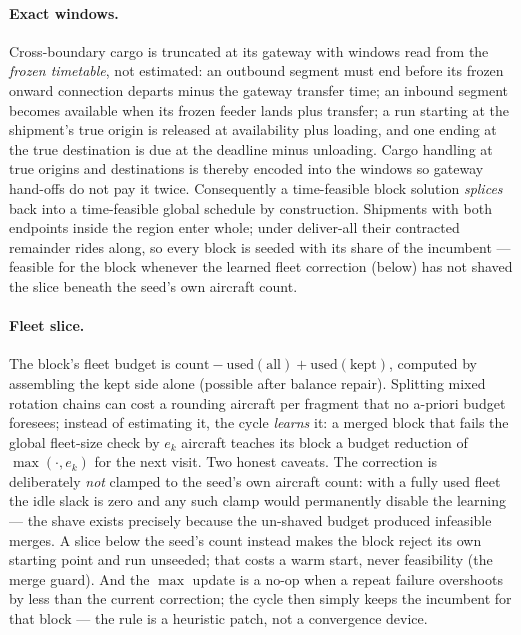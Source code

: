 \documentclass[11pt]{article}
\begin{document}
\paragraph{Exact windows.} Cross-boundary cargo is truncated at its gateway
with windows read from the \emph{frozen timetable}, not estimated: an
outbound segment must end before its frozen onward connection departs minus
the gateway transfer time; an inbound segment becomes available when its
frozen feeder lands plus transfer; a run starting at the shipment's true
origin is released at availability plus loading, and one ending at the true
destination is due at the deadline minus unloading. Cargo handling at true
origins and destinations is thereby encoded into the windows so gateway
hand-offs do not pay it twice. Consequently a time-feasible block solution
\emph{splices} back into a time-feasible global schedule by construction.
Shipments with both endpoints inside the region enter whole; under
deliver-all their contracted remainder rides along, so every block is
seeded with its share of the incumbent --- feasible for the block whenever
the learned fleet correction (below) has not shaved the slice beneath the
seed's own aircraft count.

\paragraph{Fleet slice.} The block's fleet budget is
$\mathrm{count} - \mathrm{used}(\mathrm{all}) +
\mathrm{used}(\mathrm{kept})$, computed by assembling the kept side alone
(possible after balance repair). Splitting mixed rotation chains can cost a
rounding aircraft per fragment that no a-priori budget foresees; instead of
estimating it, the cycle \emph{learns} it: a merged block that fails the
global fleet-size check by $e_k$ aircraft teaches its block a budget
reduction of $\max(\cdot, e_k)$ for the next visit. Two honest caveats.
The correction is deliberately \emph{not} clamped to the seed's own
aircraft count: with a fully used fleet the idle slack is zero and any
such clamp would permanently disable the learning --- the shave exists
precisely because the un-shaved budget produced infeasible merges. A
slice below the seed's count instead makes the block reject its own
starting point and run unseeded; that costs a warm start, never
feasibility (the merge guard). And the $\max$ update is a no-op when a
repeat failure overshoots by less than the current correction; the cycle
then simply keeps the incumbent for that block --- the rule is a
heuristic patch, not a convergence device.
\end{document}
